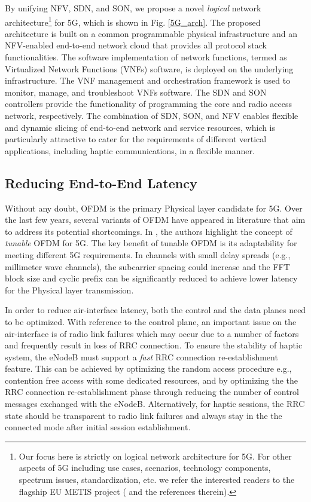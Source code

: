\documentclass[journal]{IEEEtran}
\begin{document}
By unifying NFV, SDN, and SON, we propose a novel \emph{logical} network architecture\footnote{Our focus here is strictly on logical network architecture for 5G. For other aspects of 5G including use cases, scenarios, technology components, spectrum issues, standardization, etc. we refer the interested readers to the flagship EU METIS project (\cite{METIS} and the references therein). } for 5G, which is shown in Fig. \ref{5G_arch}. The proposed architecture is built on a common programmable physical infrastructure and an NFV-enabled end-to-end network cloud that provides all protocol stack functionalities.  The software implementation of network functions, termed as Virtualized Network Functions (VNFs) software, is deployed on the underlying infrastructure. The VNF management and orchestration framework is used to monitor, manage, and troubleshoot VNFs software. The SDN and SON controllers provide the functionality of programming the core and radio access network, respectively. The combination of SDN, SON, and NFV enables \textcolor{black} {flexible and dynamic} slicing of end-to-end network and service resources, which is particularly attractive to cater for the requirements of different vertical applications, including haptic communications, in a flexible manner.






\subsection{Reducing End-to-End Latency}
Without any doubt, OFDM is the primary Physical layer candidate for 5G. Over the last few years, several variants of OFDM have appeared in literature that aim to address its potential shortcomings. In \cite{5G}, the authors highlight the concept of \emph{tunable} OFDM for 5G. The key benefit of tunable OFDM is its adaptability for meeting different 5G requirements. In channels with small delay spreads (e.g., millimeter wave channels), the subcarrier spacing could increase and the FFT block size and cyclic prefix can be significantly reduced to achieve lower latency for the Physical layer transmission.

In order to reduce air-interface latency, both the control and the data planes need to be optimized. With reference to the control plane, an important issue on the air-interface is of radio link failures which may occur due to a number of factors and frequently result in loss of RRC connection. To ensure the stability of haptic system, the eNodeB must support a \emph{fast} RRC connection re-establishment feature. This can be achieved by optimizing the random access procedure e.g., contention free access with some dedicated resources, and by optimizing the the RRC connection re-establishment phase through reducing the number of control messages exchanged with the eNodeB. Alternatively, for haptic sessions, the RRC state should be transparent to radio link failures and always stay in the the connected mode after initial session establishment.
\end{document}
